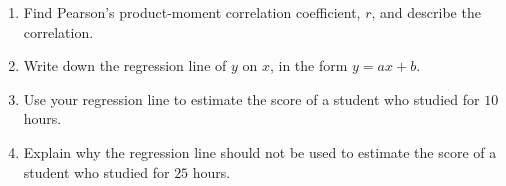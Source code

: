 \documentclass[12pt, twoside]{article}
\begin{document}
\begin{enumerate}[itemsep=0.15cm]
\begin{enumerate}[itemsep=0.1cm]
  \item Find Pearson's product-moment correlation coefficient, $r$, and
  describe the correlation.
  \item Write down the regression line of $y$ on $x$, in the form
  $y = ax + b$.
  \item Use your regression line to estimate the score of a student who
  studied for $10$ hours.
  \item Explain why the regression line should not be used to estimate the
  score of a student who studied for $25$ hours.
\end{enumerate}


\end{enumerate}
\end{document}
